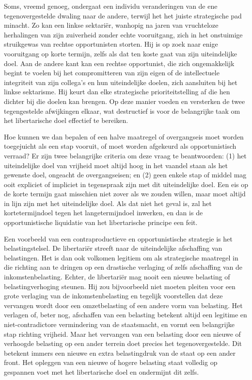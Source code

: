 \documentclass[
  a5paper,
  smalldemyvopaper,10pt,twoside,onecolumn,openright,extrafontsizes,hidelinks]{memoir}
\begin{document}
Soms, vreemd genoeg, ondergaat een individu veranderingen van de ene
tegenovergestelde dwaling naar de andere, terwijl het het juiste
strategische pad minacht. Zo kan een linkse sektariër, wanhopig na jaren
van vruchteloze herhalingen van zijn zuiverheid zonder echte
vooruitgang, zich in het onstuimige struikgewas van rechtse
opportunisten storten. Hij is op zoek naar enige vooruitgang op korte
termijn, zelfs als dat ten koste gaat van zijn uiteindelijke doel. Aan
de andere kant kan een rechtse opportunist, die zich ongemakkelijk
begint te voelen bij het compromitteren van zijn eigen of de
intellectuele integriteit van zijn collega's en hun uiteindelijke
doelen, zich aansluiten bij het linkse sektarisme. Hij keurt dan elke
strategische prioriteitstelling af die hen dichter bij die doelen kan
brengen. Op deze manier voeden en versterken de twee tegengestelde
afwijkingen elkaar, wat destructief is voor de belangrijke taak om het
libertarische doel effectief te bereiken.

Hoe kunnen we dan bepalen of een halve maatregel of overgangseis moet
worden toegejuicht als een stap vooruit, of moet worden afgekeurd als
opportunistisch verraad? Er zijn twee belangrijke criteria om deze vraag
te beantwoorden: (1) het uiteindelijke doel van vrijheid moet altijd
hoog in het vaandel staan als het gewenste doel, ongeacht de
overgangseisen; en (2) geen enkele stap of middel mag ooit expliciet of
impliciet in tegenspraak zijn met dit uiteindelijke doel. Een eis op de
korte termijn gaat misschien niet zover als we zouden willen, maar moet
altijd in lijn zijn met het uiteindelijke doel. Als dat niet het geval
is, zal het kortetermijndoel tegen het langetermijndoel inwerken, en dan
is de opportunistische liquidatie van het libertarische principe een
feit.

Een voorbeeld van een contraproductieve en opportunistische strategie is
het belastingstelsel. De libertariër streeft naar de uiteindelijke
afschaffing van belastingen. Het is dan ook volkomen legitiem om als
strategische maatregel in die richting aan te dringen op een drastische
verlaging of zelfs afschaffing van de inkomstenbelasting. Echter, de
libertariër mag nooit een nieuwe belasting of belastingverhoging
steunen. Hij zou bijvoorbeeld niet moeten pleiten voor een grote
verlaging van de inkomstenbelasting en tegelijk voorstellen dat deze
vervangen wordt door een omzetbelasting of een andere vorm van
belasting. Het verlagen of, beter nog, afschaffen van een belasting
betekent altijd een legitime en niet-contradictore vermindering van de
staatsmacht, en vormt een belangrijke stap richting vrijheid. Maar het
vervangen van een belasting door een nieuwe of verhoogde belasting op
een ander terrein doet precies het tegenovergestelde. Dit betekent
immers een nieuwe en extra belastingdruk van de staat op een ander
front. Het opleggen van een nieuwe of hogere belasting staat volledig op
gespannen voet met het libertarische doel en ondermijnt dit zelfs.
\end{document}
